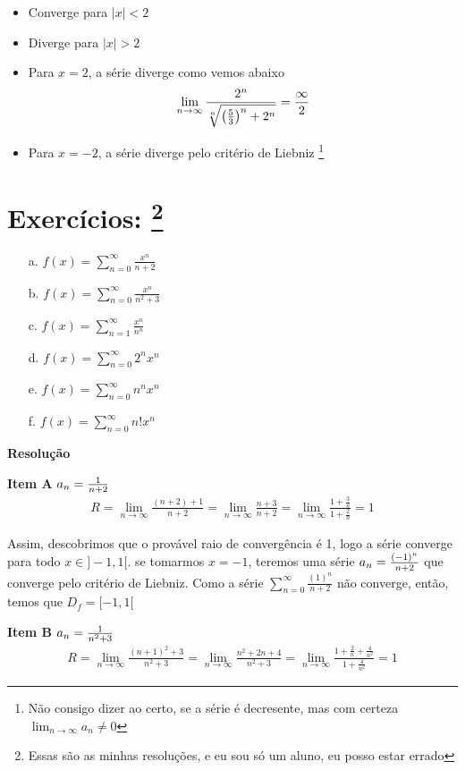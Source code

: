 \documentclass[12pt,openany, letterpaper]{book}
\newcommand{\LI}[1][n]{\lim_{{#1} \rightarrow \infty}}
\newcommand{\soma}[2][n]{\sum_{{#1} = #2}^\infty}
\newcommand{\Resolve}{\begin{center} \textbf{Resolução} \end{center}}
\begin{document}
{{\begin{itemize}
\item Converge para $|x| < 2$
\item Diverge para $|x| > 2$
\item Para $x = 2$, a série diverge como vemos abaixo $$\LI \frac{2^n}{\sqrt[n]{\left(\frac{5}{3}\right)^n + 2^n}} = {\infty \over 2} $$
\item Para $x = -2$, a série diverge pelo critério de Liebniz \footnote{Não consigo dizer ao certo, se a série é decresente, mas com certeza $\LI a_n \neq 0$}
\end{itemize}

\section*{Exercícios: \footnote{Essas são as minhas resoluções, e eu sou só um aluno, eu posso estar errado}}
\begin{multicols}{3}
\begin{itemize}
\item [a.] $f(x) = \displaystyle{\soma{0} \frac{x^n}{n+2}}$
\item [b.] $f(x) = \displaystyle{\soma{0} \frac{x^n}{n^2+3}}$
\item [c.] $f(x) = \displaystyle{\soma{1} \frac{x^n}{n^n}}$
\item [d.] $f(x) = \displaystyle{\soma{0} 2^n x^n}$
\item [e.] $f(x) = \displaystyle{\soma{0} n^n x^n}$
\item [f.] $f(x) = \displaystyle{\soma{0} n! x^n}$
\end{itemize}
\end{multicols}

\Resolve

\textbf{Item A
} $a_n = {1 \over n+2}$
\begin{align*}
R = \LI \frac{(n+2)+1}{n+2} = \LI \frac{n+3}{n+2} = \LI \frac{1 + \frac{3}{n}}{1 + \frac{2}{n}} = 1
\end{align*}

Assim, descobrimos que o provável raio de convergência é 1, logo a série converge para todo $x \in ]-1,1[$. se tomarmos $x = -1$, teremos uma série $a_n = {(-1)^n \over n + 2}$ que converge pelo critério de Liebniz. Como a série $\displaystyle{\soma{0} \frac{(1)^n}{n+2}}$ não converge, então, temos que $D_f = [-1,1[$ \vspace{5mm}

\textbf{Item B} $a_n = {1 \over n^2+3}$
\begin{align*}
R = \LI \frac{(n+1)^2+3}{n^2+3} = \LI \frac{n^2 + 2n +4}{n^2+3} = \LI \frac{1 + \frac{2}{n} + \frac{4}{n^2}}{1 + \frac{4}{n^2}} = 1
\end{align*}

}}
\end{document}
